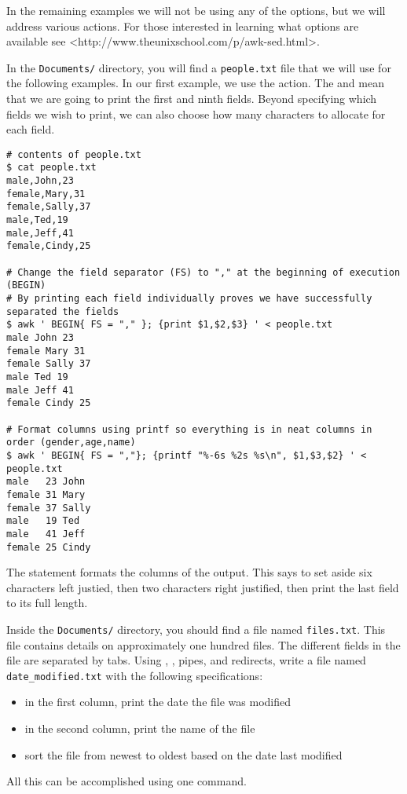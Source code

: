 In the remaining examples we will not be using any of the options, but we will address various actions.
For those interested in learning what options are available see <http://www.theunixschool.com/p/awk-sed.html>.

In the \texttt{Documents/} directory, you will find a \texttt{people.txt} file that we will use for the following examples.
In our first example, we use the  action.
The  and  mean that we are going to print the first and ninth fields.
Beyond specifying which fields we wish to print, we can also choose how many characters to allocate for each field.

\begin{lstlisting}
# contents of people.txt
$ cat people.txt
male,John,23
female,Mary,31
female,Sally,37
male,Ted,19
male,Jeff,41
female,Cindy,25

# Change the field separator (FS) to "," at the beginning of execution (BEGIN)
# By printing each field individually proves we have successfully separated the fields
$ awk ' BEGIN{ FS = "," }; {print $1,$2,$3} ' < people.txt
male John 23
female Mary 31
female Sally 37
male Ted 19
male Jeff 41
female Cindy 25

# Format columns using printf so everything is in neat columns in order (gender,age,name)
$ awk ' BEGIN{ FS = ","}; {printf "%-6s %2s %s\n", $1,$3,$2} ' < people.txt
male   23 John
female 31 Mary
female 37 Sally
male   19 Ted
male   41 Jeff
female 25 Cindy
\end{lstlisting}

The statement  formats the columns of the output.
This says to set aside six characters left justied, then two characters right justified, then print the last field to its full length.

\begin{problem}
Inside the \texttt{Documents/} directory, you should find a file named \texttt{files.txt}.
This file contains details on approximately one hundred files.
The different fields in the file are separated by tabs.
Using , , pipes, and redirects, write a file named \texttt{date\_modified.txt} with the following specifications:
\begin{itemize}
\item in the first column, print the date the file was modified
\item in the second column, print the name of the file
\item sort the file from newest to oldest based on the date last modified
\end{itemize}
All this can be accomplished using one command.
\end{problem}

